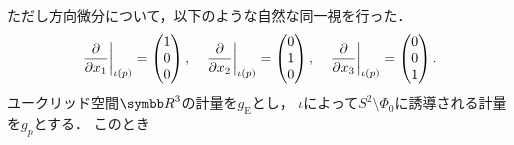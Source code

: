 \documentclass{ltjsarticle}
\begin{document}
ただし方向微分について，以下のような自然な同一視を行った．
\begin{align*}
    \left.\frac{\partial}{\partial x_1}\right\lvert_{\iota(p)} = \begin{pmatrix}
        1 \\ 0 \\ 0
    \end{pmatrix},
    \quad
    \left.\frac{\partial}{\partial x_2}\right\lvert_{\iota(p)} = \begin{pmatrix}
        0 \\ 1 \\ 0
    \end{pmatrix},
    \quad
    \left.\frac{\partial}{\partial x_3}\right\lvert_{\iota(p)} = \begin{pmatrix}
        0 \\ 0 \\ 1
    \end{pmatrix}.
\end{align*}
ユークリッド空間\({\Real}^3\)の計量を\(g_\text{E}\)とし，
\(\iota\)によって\(S^2 \setminus \Phi_0\)に誘導される計量を\(g_p\)とする．
このとき
\end{document}

